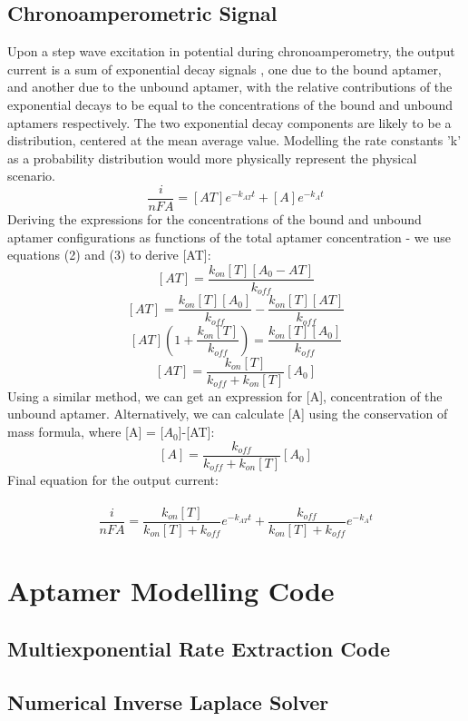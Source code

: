 \begin{appendices}
\subsection{Chronoamperometric Signal}
Upon a step wave excitation in potential during chronoamperometry, the output current is a sum of exponential decay signals \cite{arroyo2018subsecond}, one due to the bound aptamer, and another due to the unbound aptamer, with the relative contributions of the exponential decays to be equal to the concentrations of the bound and unbound aptamers respectively. The two exponential decay components are likely to be a distribution, centered at the mean average value. Modelling the rate constants 'k' as a probability distribution would more physically represent the physical scenario.
$$ \frac{i}{nFA} = [AT]e^{-k_{AT}t} + [A]e^{-k_{A}t} $$
Deriving the expressions for the concentrations of the bound and unbound aptamer configurations as functions of the total aptamer concentration - we use equations (2) and (3) to derive [AT]:
$$ [AT] = \frac{k_{on}[T][A_{0}-AT]}{k_{off}} $$
$$ [AT] = \frac{k_{on}[T][A_{0}]}{k_{off}} - \frac{k_{on}[T][AT]}{k_{off}} $$
$$ [AT](1+\frac{k_{on}[T]}{k_{off}}) = \frac{k_{on}[T][A_{0}]}{k_{off}} $$
$$  [AT] = \frac{k_{on}[T]}{k_{off}+k_{on}[T]}[A_{0}] $$
Using a similar method, we can get an expression for [A], concentration of the unbound aptamer. Alternatively, we can calculate [A] using the conservation of mass formula, where [A] = [$A_{0}$]-[AT]:
$$ [A] = \frac{k_{off}}{k_{off}+k_{on}[T]}[A_{0}] $$
Final equation for the output current:\\\\
\begin{equation}
\frac{i}{nFA} = \frac{k_{on}[T]}{k_{on}[T]+k_{off}}e^{-k_{AT}t} + \frac{k_{off}}{k_{on}[T]+k_{off}}e^{-k_{A}t}
\end{equation}
\clearpage
\section{Aptamer Modelling Code} \label{app:apt_mod}
\subsection{Multiexponential Rate Extraction Code}

\newpage
\subsection{Numerical Inverse Laplace Solver}

\newpage

\end{appendices}
